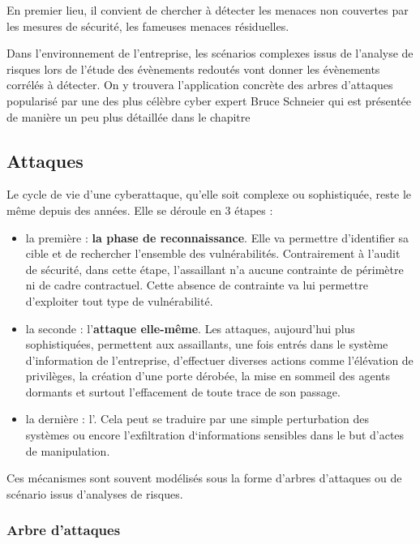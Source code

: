 En premier lieu, il convient de chercher à détecter les menaces non couvertes par les mesures de sécurité, les fameuses menaces résiduelles.

Dans l'environnement de l'entreprise, les scénarios complexes issus de l'analyse de risques lors de l'étude des évènements redoutés vont donner les évènements corrélés à détecter.
On y trouvera l'application concrète des arbres d'attaques popularisé par une des plus célèbre cyber expert Bruce Schneier \cite{schneier1999attack} qui est présentée de manière un peu plus détaillée dans le chapitre 



\subsection{Attaques}


Le cycle de vie d’une cyberattaque, qu’elle soit complexe ou sophistiquée, reste le même depuis des années. Elle se déroule en 3 étapes :
\begin{itemize}
  \item la première : \textbf{la phase de reconnaissance}. Elle va permettre d’identifier sa cible et de rechercher l’ensemble des vulnérabilités. Contrairement à l’audit de sécurité, dans cette étape, l’assaillant n’a aucune contrainte de périmètre ni de cadre contractuel. Cette absence de contrainte va lui permettre d’exploiter tout type de vulnérabilité.
  \item la seconde : l’\textbf{attaque elle-même}. Les attaques, aujourd’hui plus sophistiquées, permettent aux assaillants, une fois entrés dans le système d’information de l’entreprise, d’effectuer diverses actions comme l’élévation de privilèges, la création d’une porte dérobée, la mise en sommeil des agents dormants et surtout l’effacement de toute trace de son passage.
  \item  la dernière : l’. Cela peut se traduire par une simple perturbation des systèmes ou encore l’exfiltration d‘informations sensibles dans le but d’actes de manipulation.
\end{itemize}

Ces mécanismes sont souvent modélisés sous la forme d'arbres d'attaques ou de scénario issus d'analyses de risques.

\subsubsection{Arbre d'attaques} \label{ref_arbre_attaques}

